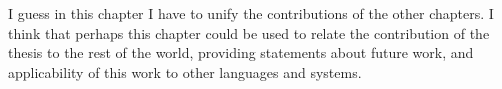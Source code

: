 \documentclass[a4paper,twoside]{report}
\begin{document}

I guess in this chapter I have to unify the contributions of the other
chapters.
I think that perhaps this chapter could be used to relate the contribution
of the thesis to the rest of the world, providing statements about future
work, and applicability of this work to other languages and systems.




\end{document}
